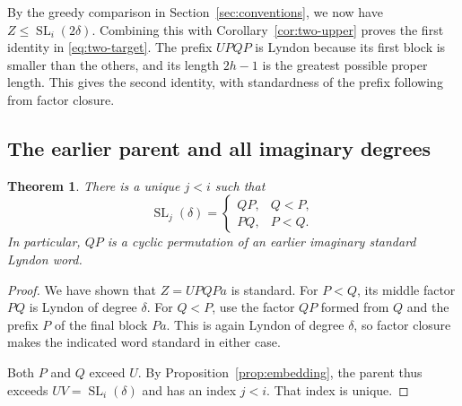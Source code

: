 \documentclass[11pt]{amsart}
\numberwithin{equation}{section}
\newtheorem{theorem}{Theorem}[section]
\theoremstyle{definition}
\DeclareMathOperator{\SL}{SL}
\begin{document}
By the greedy comparison in Section~\ref{sec:conventions}, we now have $Z\leq\SL_i(2\delta)$. Combining this with Corollary~\ref{cor:two-upper} proves the first identity in \eqref{eq:two-target}. The prefix $UPQP$ is Lyndon because its first block is smaller than the others, and its length $2h-1$ is the greatest possible proper length. This gives the second identity, with standardness of the prefix following from factor closure.

\subsection{The earlier parent and all imaginary degrees}\label{subsec:parent}

\begin{theorem}\label{thm:parent}
There is a unique $j<i$ such that
\begin{equation}\label{eq:parent}
 \SL_j(\delta)=
 \begin{cases}
 QP,&Q<P,\\
 PQ,&P<Q.
 \end{cases}
\end{equation}
In particular, $QP$ is a cyclic permutation of an earlier imaginary standard Lyndon word.
\end{theorem}
\begin{proof}
We have shown that $Z=UPQPa$ is standard. For $P<Q$, its middle factor $PQ$ is Lyndon of degree $\delta$. For $Q<P$, use the factor $QP$ formed from $Q$ and the prefix $P$ of the final block $Pa$. This is again Lyndon of degree $\delta$, so factor closure makes the indicated word standard in either case.

Both $P$ and $Q$ exceed $U$. By Proposition~\ref{prop:embedding}, the parent thus exceeds $UV=\SL_i(\delta)$ and has an index $j<i$. That index is unique.
\end{proof}
\end{document}

